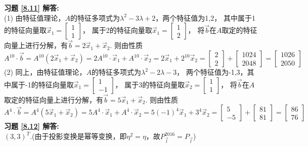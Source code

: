 \documentclass[a4paper]{book}
\begin{document}
\textbf{习题 \ref{8.11} 解答:}\\
(1) 由特征值理论，$A$的特征多项式为$\lambda^2-3\lambda+2$，两个特征值为1,2，
其中属于1的特征向量取$\vec{x}_1=\begin{bmatrix}1\\1\end{bmatrix}$，
属于2的特征向量取$\vec{x}_1=\begin{bmatrix}1\\2\end{bmatrix}$，
将$\vec{b}$在$A$取定的特征向量上进行分解，有$\vec{b}=2\vec{x}_1 +\vec{x}_2$.
则由性质$A^{10}\cdot\vec{b}=A^{10}(2\vec{x}_1+\vec{x}_2)=2A^{10}\cdot\vec{x}_1+A^{10}\cdot\vec{x}_2=2\vec{x}_1+2^{10}\vec{x}_2=
\begin{bmatrix}2\\2\end{bmatrix}+ \begin{bmatrix}1024\\2048\end{bmatrix}=\begin{bmatrix}1026\\2050\end{bmatrix}$\\
(2)  同上，由特征值理论，$A$的特征多项式为$\lambda^2-2\lambda-3$，
两个特征值为-1,3，其中属于-1的特征向量取$\vec{x}_1=\begin{bmatrix}1\\-1\end{bmatrix}$，
属于3的特征向量取$\vec{x}_2=\begin{bmatrix}1\\1\end{bmatrix}$，
将$\vec{b}$在$A$取定的特征向量上进行分解，有$\vec{b}=5\vec{x}_1 +\vec{x}_2$.
则由性质$A^4\cdot\vec{b}=A^4(5\vec{x}_1+\vec{x}_2)=5A^4\cdot\vec{x}_1+A^4\cdot\vec{x}_2=5(-1)^4\vec{x}_1+3^4\vec{x}_2=
\begin{bmatrix}5\\-5\end{bmatrix}+ \begin{bmatrix}81\\81\end{bmatrix}=\begin{bmatrix}86\\76\end{bmatrix}$\\
\textbf{习题 \ref{8.12} 解答:}\\
$(3,3)^T$.(由于投影变换是幂等变换，即$\eta^2=\eta$，故$P_{\vec{l}}^{2016}=P_{\vec{l}}$)\\
\end{document}
